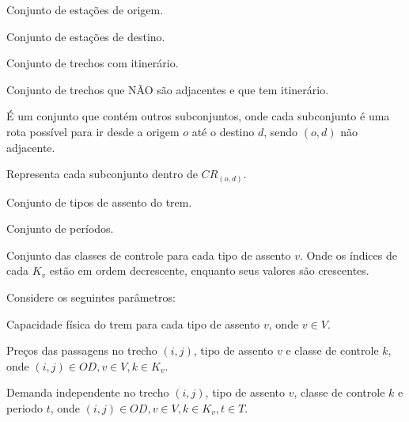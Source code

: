 \begin{description}[style=unboxed, leftmargin=2.5cm, labelindent=1.5cm]
	\setlength{\itemsep}{-2.2em} %
	\setlength{\parskip}{0em} %
	\item[$O:$] Conjunto de estações de origem. \\
	\item[$D:$] Conjunto de estações de destino. \\
	\item[$OD:$] Conjunto de trechos com itinerário. \\
	\item[$NAD:$] Conjunto de trechos que NÃO são adjacentes e que tem itinerário.\\
	\item[$CR_{(o,d)}:$] É um conjunto que contém outros subconjuntos, onde cada subconjunto é uma rota possível para ir desde a origem $o$ até o destino $d$, sendo $(o,d)$ não adjacente. \\
	\item[$S:$] Representa cada subconjunto dentro de $CR_{(o,d)}$. \\
	\item[$V:$] Conjunto de tipos de assento do trem. \\
	\item[$T:$] Conjunto de períodos. \\
	\item[$K_v:$] Conjunto das classes de controle para cada tipo de assento $v$. Onde os índices de cada $K_v$ estão em ordem decrescente, enquanto seus valores são crescentes.
\end{description}

Considere os seguintes parâmetros:
\begin{description}[style=unboxed, leftmargin=2.5cm, labelindent=1.5cm]
	\setlength{\itemsep}{-2.2em} %
	\setlength{\parskip}{0em} %
	\item[$Q_v:$] Capacidade física do trem para cada tipo de assento $v$, onde $v \in V$. \\
	\item[$P_{ijvk}:$] Preços  das passagens no trecho $(i,j)$, tipo de assento $v$ e classe de controle $k$, onde $(i,j) \in OD,v \in V, k \in K_v$.  \\
	\item[$d_{ijvkt}:$] Demanda independente no trecho $(i,j)$, tipo de assento $v$, classe de controle $k$ e periodo $t$, onde $(i,j) \in OD,v \in V, k \in K_v, t \in T$.
\end{description}

